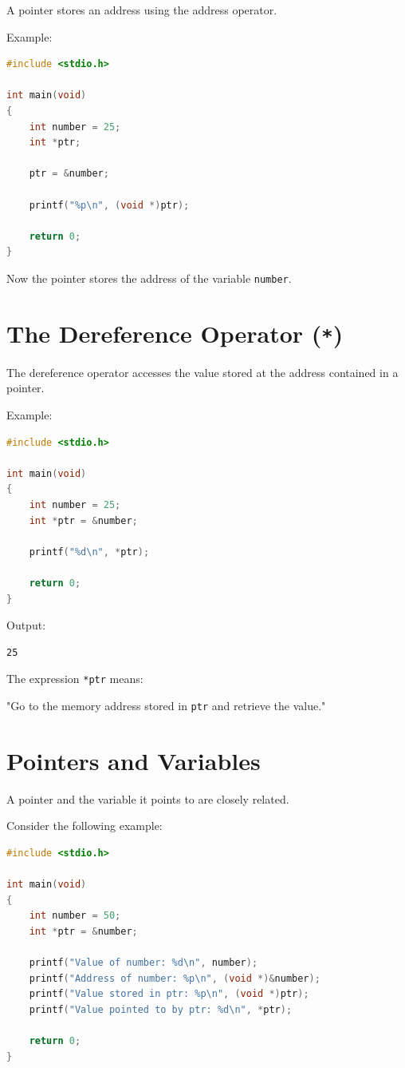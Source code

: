 \documentclass[12pt,openany]{book}
\begin{document}
A pointer stores an address using the address operator.

Example:

\begin{lstlisting}[language=C]
#include <stdio.h>

int main(void)
{
    int number = 25;
    int *ptr;

    ptr = &number;

    printf("%p\n", (void *)ptr);

    return 0;
}
\end{lstlisting}

Now the pointer stores the address of the variable \texttt{number}.

\section{The Dereference Operator (\texttt{*})}

The dereference operator accesses the value stored at the address contained in a pointer.

Example:

\begin{lstlisting}[language=C]
#include <stdio.h>

int main(void)
{
    int number = 25;
    int *ptr = &number;

    printf("%d\n", *ptr);

    return 0;
}
\end{lstlisting}

Output:

\begin{lstlisting}
25
\end{lstlisting}

The expression \texttt{*ptr} means:

"Go to the memory address stored in \texttt{ptr} and retrieve the value."
\section{Pointers and Variables}

A pointer and the variable it points to are closely related.

Consider the following example:

\begin{lstlisting}[language=C]
#include <stdio.h>

int main(void)
{
    int number = 50;
    int *ptr = &number;

    printf("Value of number: %d\n", number);
    printf("Address of number: %p\n", (void *)&number);
    printf("Value stored in ptr: %p\n", (void *)ptr);
    printf("Value pointed to by ptr: %d\n", *ptr);

    return 0;
}
\end{lstlisting}
\end{document}
